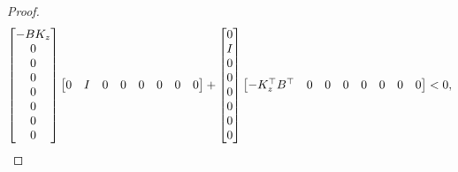 \begin{proof}
\begin{multline}
\begin{bmatrix}
		-B K_z \\0\\0\\0\\0\\0\\0\\0
	\end{bmatrix}
	\begin{bmatrix}
		0 & I & 0&0&0&0&0&0
	\end{bmatrix}
	+
	\begin{bmatrix}
		0 \\I\\0\\0\\0\\0\\0\\0
	\end{bmatrix}
	\begin{bmatrix}
		-K_z^\top B^\top & 0 & 0&0&0&0&0&0
	\end{bmatrix}
	<0,
	\end{multline}
	

\end{proof}
